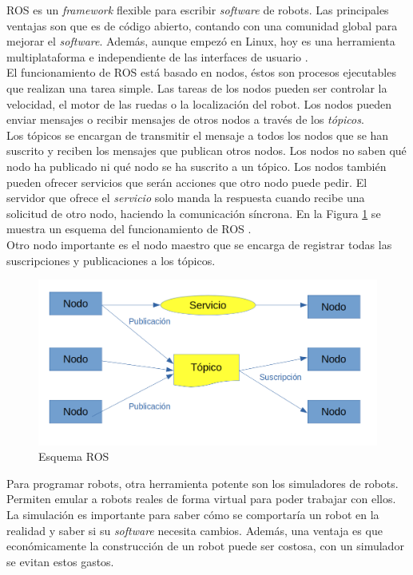ROS es un \textit{framework} flexible para escribir \textit{software} de robots. Las principales ventajas son que es de código abierto, contando con una comunidad global para mejorar el \textit{software}. Además, aunque empezó en Linux, hoy es una herramienta multiplataforma e independiente de las interfaces de usuario \cite{ros}.\\

El funcionamiento de ROS está basado en nodos, éstos son procesos ejecutables que realizan una tarea simple. Las tareas de los nodos pueden ser controlar la velocidad, el motor de las ruedas o la localización del robot. Los nodos pueden enviar mensajes o recibir mensajes de otros nodos a través de los \textit{tópicos}. \\

Los tópicos se encargan de transmitir el mensaje a todos los nodos que se han suscrito y reciben los mensajes que publican otros nodos. Los nodos no saben qué nodo ha publicado ni qué nodo se ha suscrito a un tópico. Los nodos también pueden ofrecer servicios que serán acciones que otro nodo puede pedir. El servidor que ofrece el \textit{servicio} solo manda la respuesta cuando recibe una solicitud de otro nodo, haciendo la comunicación síncrona. En la Figura \ref{fig:ros} se muestra un esquema del funcionamiento de ROS \cite{ros2}.\\

Otro nodo importante es el nodo maestro que se encarga de registrar todas las suscripciones y publicaciones a los tópicos.\\

\begin{figure}[H]
    \centering
    \includegraphics[width=14cm, keepaspectratio]{img/ros.png}
    \caption{Esquema ROS}
    \label{fig:ros}
\end{figure}
\newpage
Para programar robots, otra herramienta potente son los simuladores de robots. Permiten emular a robots reales de forma virtual para poder trabajar con ellos. La simulación es importante para saber cómo se comportaría un robot en la realidad y saber si su \textit{software} necesita cambios. Además, una ventaja es que económicamente la construcción de un robot puede ser costosa, con un simulador se evitan estos gastos.\\

